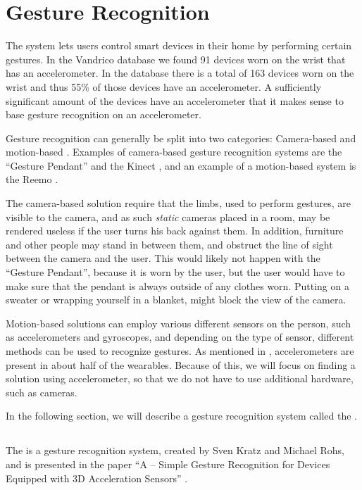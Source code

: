 \section{Gesture Recognition}\label{sec:gesturerecognition}
The system lets users control smart devices in their home by performing certain gestures.
In the Vandrico database we found 91 devices worn on the wrist that has an accelerometer. In the database there is a total of 163 devices worn on the wrist and thus 55\% of those devices have an accelerometer. A sufficiently significant amount of the devices have an accelerometer that it makes sense to base gesture recognition on an accelerometer.

Gesture recognition can generally be split into two categories: 
Camera-based and motion-based \cite{Kela2006}. 
Examples of camera-based gesture recognition systems are the ``Gesture Pendant'' \cite{starner2000gesture} and the Kinect \cite{kinect}, 
and an example of a motion-based system is the Reemo \cite{Reemo}.

The camera-based solution require that the limbs, 
used to perform gestures, 
are visible to the camera, 
and as such \emph{static} cameras placed in a room, 
may be rendered useless if the user turns his back against them. 
In addition, furniture and other people may stand in between them, 
and obstruct the line of sight between the camera and the user.
This would likely not happen with the ``Gesture Pendant'',
because it is worn by the user, 
but the user would have to make sure that the pendant is always outside of any clothes worn.
Putting on a sweater or wrapping yourself in a blanket, 
might block the view of the camera.

Motion-based solutions can employ various different sensors on the person,
such as accelerometers and gyroscopes, 
and depending on the type of sensor, 
different methods can be used to recognize gestures.
As mentioned in , accelerometers are present in about half of the wearables. 
Because of this, we will focus on finding a solution using accelerometer, 
so that we do not have to use additional hardware, such as cameras. 

In the following section, we will describe a gesture recognition system called the \threedollar. 

\subsection{\threedollar}\label{sec:threedollar}
The \threedollar is a gesture recognition system, 
created by Sven Kratz and Michael Rohs, 
and is presented in the paper ``A \threedollar – Simple Gesture Recognition for Devices Equipped with 3D Acceleration Sensors'' \cite{threedollar}.


